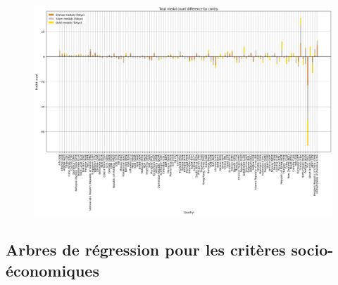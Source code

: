 \documentclass{article}
\begin{document}
\begin{figure}[H]
    \center
    
    \includegraphics[width=1.0998\linewidth]{assets/diff_nb_total_medailles_par_pays.png}
\end{figure}

\clearpage
\subsection{Arbres de régression pour les critères socio-économiques}
\label{annexe_arbres}
\end{document}
